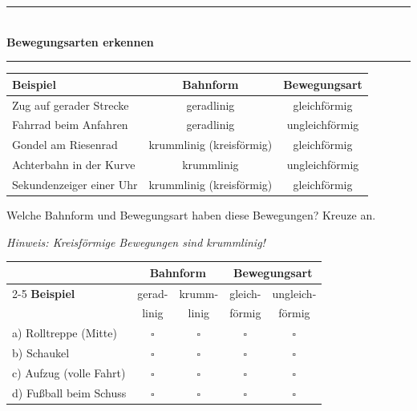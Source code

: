 \documentclass[11pt, a4paper]{article}
\newcommand{\seitentitel}[1]{%
    \noindent\textcolor{physik}{\rule{\textwidth}{2pt}}\\[0.3em]
    {\LARGE\bfseries\textcolor{physik}{#1}}\\[0.2em]
    \textcolor{physik}{\rule{\textwidth}{0.5pt}}
    \vspace{0.5em}
}
\newcommand{\abschnitt}[1]{%
    \vspace{8pt}%
    \noindent{\large\bfseries\textcolor{physik}{#1}}%
    \vspace{4pt}%
}
\begin{document}

\newpage

\seitentitel{Bewegungsarten erkennen}

\abschnitt{4. Beispiele aus dem Alltag}

\begin{center}
\renewcommand{\arraystretch}{1.4}
\begin{tabular}{|p{4.5cm}|c|c|}
\hline
\textbf{Beispiel} & \textbf{Bahnform} & \textbf{Bewegungsart} \\
\hline
Zug auf gerader Strecke & geradlinig & gleichförmig \\
\hline
Fahrrad beim Anfahren & geradlinig & ungleichförmig \\
\hline
Gondel am Riesenrad & krummlinig (kreisförmig) & gleichförmig \\
\hline
Achterbahn in der Kurve & krummlinig & ungleichförmig \\
\hline
Sekundenzeiger einer Uhr & krummlinig (kreisförmig) & gleichförmig \\
\hline
\end{tabular}
\end{center}

\vspace{0.5em}

\abschnitt{5. Übung: Ordne zu!}

Welche Bahnform und Bewegungsart haben diese Bewegungen? Kreuze an.

\textit{Hinweis: Kreisförmige Bewegungen sind krummlinig!}

\begin{center}
\renewcommand{\arraystretch}{1.6}
\begin{tabular}{|p{3.5cm}|c|c|c|c|}
\hline
& \multicolumn{2}{c|}{\textbf{Bahnform}} & \multicolumn{2}{c|}{\textbf{Bewegungsart}} \\
\cline{2-5}
\textbf{Beispiel} & gerad- & krumm- & gleich- & ungleich- \\
& linig & linig & förmig & förmig \\
\hline
a) Rolltreppe (Mitte) & $\square$ & $\square$ & $\square$ & $\square$ \\
\hline
b) Schaukel & $\square$ & $\square$ & $\square$ & $\square$ \\
\hline
c) Aufzug (volle Fahrt) & $\square$ & $\square$ & $\square$ & $\square$ \\
\hline
d) Fußball beim Schuss & $\square$ & $\square$ & $\square$ & $\square$ \\
\hline
\end{tabular}
\end{center}
\end{document}
